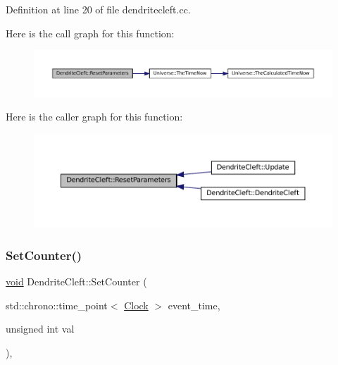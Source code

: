 Definition at line 20 of file dendritecleft.\+cc.

Here is the call graph for this function\+:\nopagebreak
\begin{figure}[H]
\begin{center}
\leavevmode
\includegraphics[width=350pt]{class_dendrite_cleft_a3fee388d7023cfb460412e0322244ae2_cgraph}
\end{center}
\end{figure}
Here is the caller graph for this function\+:\nopagebreak
\begin{figure}[H]
\begin{center}
\leavevmode
\includegraphics[width=350pt]{class_dendrite_cleft_a3fee388d7023cfb460412e0322244ae2_icgraph}
\end{center}
\end{figure}
\mbox{\label{class_dendrite_cleft_a428b8e5117f381a382e0071b936d42a1}} 
\subsubsection{\texorpdfstring{Set\+Counter()}{SetCounter()}}
{\footnotesize\ttfamily \mbox{\hyperlink{glad_8h_a950fc91edb4504f62f1c577bf4727c29}{void}} Dendrite\+Cleft\+::\+Set\+Counter (\begin{DoxyParamCaption}\item[{std\+::chrono\+::time\+\_\+point$<$ \mbox{\hyperlink{universe_8h_a0ef8d951d1ca5ab3cfaf7ab4c7a6fd80}{Clock}} $>$}]{event\+\_\+time,  }\item[{unsigned int}]{val }\end{DoxyParamCaption})\hspace{0.3cm}{\ttfamily [inline]}, {\ttfamily [virtual]}}



